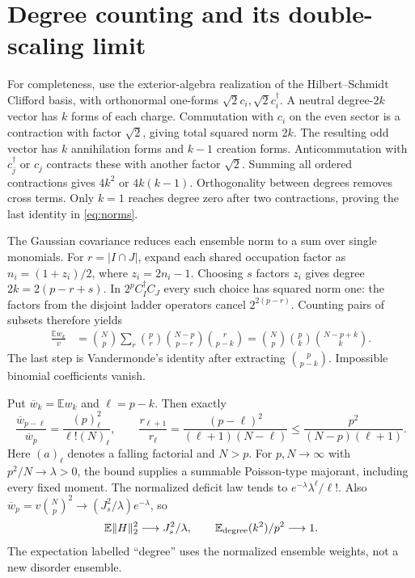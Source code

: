 \documentclass[11pt,a4paper]{article}
\newcommand{\EE}{\mathbb E}
\begin{document}
\newpage
\section{Degree counting and its double-scaling limit}
For completeness, use the exterior-algebra realization of the
Hilbert--Schmidt Clifford basis, with orthonormal one-forms
$\sqrt2c_i,\sqrt2c_i^\dagger$. A neutral degree-$2k$ vector has
$k$ forms of each charge. Commutation with $c_i$ on the even
sector is a contraction with factor $\sqrt2$, giving total squared
norm $2k$. The resulting odd vector has $k$ annihilation forms and
$k-1$ creation forms. Anticommutation with $c_j^\dagger$ or $c_j$
contracts these with another factor $\sqrt2$. Summing all ordered
contractions gives $4k^2$ or $4k(k-1)$. Orthogonality between degrees
removes cross terms. Only $k=1$ reaches degree zero after two
contractions, proving the last identity in \eqref{eq:norms}.

The Gaussian covariance reduces each ensemble norm to a sum over
single monomials. For $r=|I\cap J|$, expand each shared occupation
factor as $n_i=(1+z_i)/2$, where $z_i=2n_i-1$.
Choosing $s$ factors $z_i$ gives degree $2k=2(p-r+s)$.
In $2^pC_I^\dagger C_J$ every such choice has squared norm one:
the factors from the disjoint ladder operators cancel $2^{2(p-r)}$.
Counting pairs of subsets therefore yields
\begin{align}
 \frac{\EE w_k}{v}
 &=\binom Np\sum_r\binom pr\binom{N-p}{p-r}\binom r{p-k}
 =\binom Np\binom pk\binom{N-p+k}{k}.\label{eq:weight}
\end{align}
The last step is Vandermonde's identity after extracting
$\binom p{p-k}$. Impossible binomial coefficients vanish.

Put $\overline w_k=\EE w_k$ and $\ell=p-k$. Then exactly
\begin{equation}
 \frac{\overline w_{p-\ell}}{\overline w_p}
 =\frac{(p)_\ell^2}{\ell!(N)_\ell},\qquad
 \frac{r_{\ell+1}}{r_\ell}
 =\frac{(p-\ell)^2}{(\ell+1)(N-\ell)}
 \leq\frac{p^2}{(N-p)(\ell+1)}.
\end{equation}
Here $(a)_\ell$ denotes a falling factorial and $N>p$.
For $p,N\to\infty$ with $p^2/N\to\lambda>0$, the bound supplies
a summable Poisson-type majorant, including every fixed moment.
The normalized deficit law tends to $e^{-\lambda}\lambda^\ell/\ell!$.
Also $\overline w_p=v\binom Np^2\to
(J_s^2/\lambda)e^{-\lambda}$, so
\begin{equation}
 \EE\|H\|_2^2\longrightarrow J_s^2/\lambda,\qquad
 \EE_{\rm degree}(k^2)/p^2\longrightarrow1.
\end{equation}
The expectation labelled ``degree'' uses the normalized ensemble
weights, not a new disorder ensemble.
\end{document}
